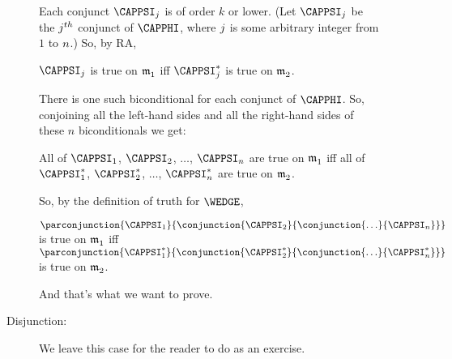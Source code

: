 \begin{PROOF}
\begin{description}
\begin{description}
Each conjunct $\CAPPSI_{\integer{j}}$ is of order $k$ or lower.  (Let $\CAPPSI_{\integer{j}}$ be the $j^{th}$ conjunct of $\CAPPHI$, where $j$ is some arbitrary integer from $1$ to $n$.)  So, by RA,
\begin{center}
$\CAPPSI_j$ is true on $\mathfrak{m^{\mathrm{}}_{\mathrm{1}}}$ iff $\CAPPSI_j^*$ is true on $\mathfrak{m^{\mathrm{}}_{\mathrm{2}}}$.
\end{center}
There is one such biconditional for each conjunct of $\CAPPHI$.  So, conjoining all the left-hand sides and all the right-hand sides of these $n$ biconditionals we get:
\begin{center}
All of $\CAPPSI_1$, $\CAPPSI_2$, $\ldots$, $\CAPPSI_{\integer{n}}$ are true on $\mathfrak{m^{\mathrm{}}_{\mathrm{1}}}$ iff all of $\CAPPSI_1^*$, $\CAPPSI_2^*$, $\ldots$, $\CAPPSI_{\integer{n}}^*$ are true on $\mathfrak{m^{\mathrm{}}_{\mathrm{2}}}$.
\end{center}
So, by the definition of truth for $\WEDGE$,
\begin{center}
$\parconjunction{\CAPPSI_1}{\conjunction{\CAPPSI_2}{\conjunction{\ldots}{\CAPPSI_{\integer{n}}}}}$ is true on $\mathfrak{m^{\mathrm{}}_{\mathrm{1}}}$ iff  $\parconjunction{\CAPPSI_1^*}{\conjunction{\CAPPSI_2^*}{\conjunction{\ldots}{\CAPPSI_{\integer{n}}^*}}}$ is true on $\mathfrak{m^{\mathrm{}}_{\mathrm{2}}}$.
\end{center}
And that's what we want to prove.

\item[Disjunction:] We leave this case for the reader to do as an exercise.


\end{description}
\end{description}
\end{PROOF}
